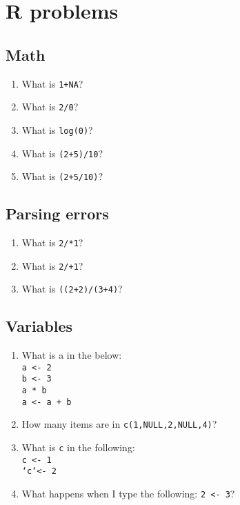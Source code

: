 \documentclass[12pt,a4paper]{article}
\begin{document}
\section*{R problems}

\onehalfspacing

\subsection*{Math}

\begin{enumerate}
\item What is \texttt{1+NA}?
\item What is \texttt{2/0}?
\item What is \texttt{log(0)}?
\vspace{1em}
\item What is \texttt{(2+5)/10}?
\item What is \texttt{(2+5/10)}?
\end{enumerate}


\subsection*{Parsing errors}
\begin{enumerate}
\item What is \texttt{2/*1}?
\item What is \texttt{2/+1}?
\vspace{1em}
\item What is \texttt{((2+2)/(3+4)}?
\end{enumerate}


\subsection*{Variables}
\begin{enumerate}
\item What is {a} in the below:\\
\texttt{a <- 2\\
b <- 3\\
a * b\\
a <- a + b\\
}
\item How many items are in \texttt{c(1,NULL,2,NULL,4)}?
\vspace{1em}
\item What is \texttt{c} in the following:\\
\texttt{c <- 1\\
\lq c\lq <- 2
}
\item What happens when I type the following: \texttt{2 <- 3}?
\end{enumerate}
\end{document}
